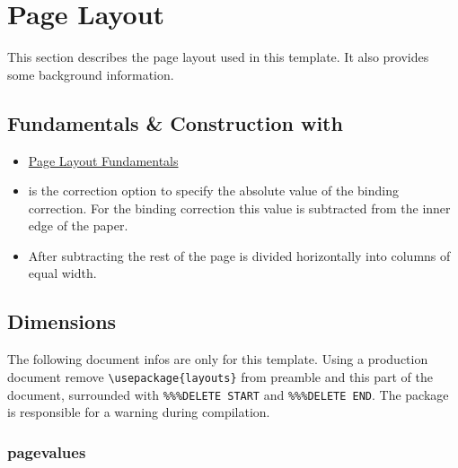 \section{Page Layout}
This section describes the page layout used in this template. It also provides
some background information.
\subsection{Fundamentals \& Construction with }
\begin{itemize}
    \item{\href{http://packages.oth-regensburg.de/ctan/macros/latex/contrib/koma-script/doc/scrguide.pdf#section.2.1}
        {Page Layout Fundamentals}}
    \item{\href{http://packages.oth-regensburg.de/ctan/macros/latex/contrib/koma-script/doc/scrguide.pdf#section.2.2}
            {} is the correction option to specify the absolute value of the
            binding correction. For the binding correction this value is
            subtracted from the inner edge of the paper. \autocite{KOH19}
    }
    \item{After subtracting  the rest of the page is divided
            horizontally into \href{http://packages.oth-regensburg.de/ctan/macros/latex/contrib/koma-script/doc/scrguide.pdf#section.2.6}
            {} columns of equal width. \autocite{KOH19}
    }
\end{itemize}

\subsection{Dimensions}
The following document infos are only for this template. Using a production
document remove \verb|\usepackage{layouts}| from preamble and this part of the
document, surrounded with \verb+%%%DELETE START+ and \verb+%%%DELETE END+.
The package  is responsible for a warning  during compilation.

\subsubsection{pagevalues}
\pagevalues

